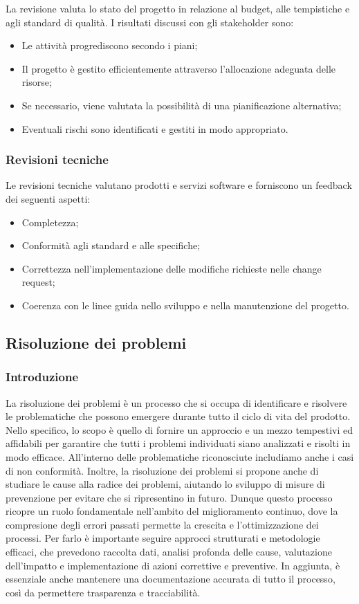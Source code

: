 La revisione valuta lo stato del progetto in relazione al budget, alle tempistiche e agli standard di qualità. I risultati discussi con gli
stakeholder sono:
\begin{itemize}
	\item Le attività progrediscono secondo i piani;
	\item Il progetto è gestito efficientemente attraverso l'allocazione adeguata delle risorse;
	\item Se necessario, viene valutata la possibilità di una pianificazione alternativa;
	\item Eventuali rischi sono identificati e gestiti in modo appropriato.
\end{itemize}

\subsubsection{Revisioni tecniche}
Le revisioni tecniche valutano prodotti e servizi software e forniscono un feedback dei seguenti aspetti:
\begin{itemize}
	\item Completezza;
	\item Conformità agli standard e alle specifiche;
	\item Correttezza nell'implementazione delle modifiche richieste nelle change request;
	\item Coerenza con le linee guida nello sviluppo e nella manutenzione del progetto.
\end{itemize}

\subsection{Risoluzione dei problemi}
\subsubsection{Introduzione}
La risoluzione dei problemi è un processo che si occupa di identificare e risolvere le problematiche che possono emergere durante tutto il ciclo
di vita del prodotto. Nello specifico, lo scopo è quello di fornire un approccio e un mezzo tempestivi ed affidabili per garantire che tutti
i problemi individuati siano analizzati e risolti in modo efficace. All'interno delle problematiche riconosciute includiamo anche i casi di non
conformità. Inoltre, la risoluzione dei problemi si propone anche di studiare le cause alla radice dei problemi, aiutando lo sviluppo di misure
di prevenzione per evitare che si ripresentino in futuro. Dunque  questo processo ricopre un ruolo fondamentale nell'ambito del miglioramento
continuo, dove la compresione degli errori passati permette la crescita e l'ottimizzazione dei processi. Per farlo è importante seguire
approcci strutturati e metodologie efficaci, che prevedono raccolta dati, analisi profonda delle cause, valutazione dell'impatto e implementazione
di azioni correttive e preventive. In aggiunta, è essenziale anche mantenere una documentazione accurata di tutto il processo, così da
permettere trasparenza e tracciabilità.

